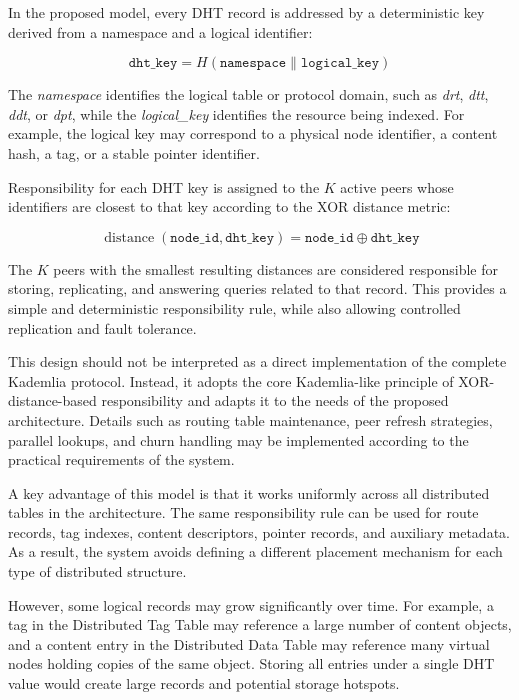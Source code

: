 \documentclass[12pt,a4paper]{article}
\begin{document}
In the proposed model, every DHT record is addressed by a deterministic key derived
from a namespace and a logical identifier:

\[
\texttt{dht\_key} = H(\texttt{namespace} \parallel \texttt{logical\_key})
\]

The \textit{namespace} identifies the logical table or protocol domain, such as
\textit{drt}, \textit{dtt}, \textit{ddt}, or \textit{dpt}, while the
\textit{logical\_key} identifies the resource being indexed. For example, the logical
key may correspond to a physical node identifier, a content hash, a tag, or a stable
pointer identifier.

Responsibility for each DHT key is assigned to the \(K\) active peers whose
identifiers are closest to that key according to the XOR distance metric:

\[
\operatorname{distance}(\texttt{node\_id}, \texttt{dht\_key}) = \texttt{node\_id} \oplus \texttt{dht\_key}
\]

The \(K\) peers with the smallest resulting distances are considered responsible for
storing, replicating, and answering queries related to that record. This provides a
simple and deterministic responsibility rule, while also allowing controlled
replication and fault tolerance.

This design should not be interpreted as a direct implementation of the complete
Kademlia protocol. Instead, it adopts the core Kademlia-like principle of
XOR-distance-based responsibility and adapts it to the needs of the proposed
architecture. Details such as routing table maintenance, peer refresh strategies,
parallel lookups, and churn handling may be implemented according to the practical
requirements of the system.

A key advantage of this model is that it works uniformly across all distributed
tables in the architecture. The same responsibility rule can be used for route
records, tag indexes, content descriptors, pointer records, and auxiliary metadata.
As a result, the system avoids defining a different placement mechanism for each
type of distributed structure.

However, some logical records may grow significantly over time. For example, a tag
in the Distributed Tag Table may reference a large number of content objects, and a
content entry in the Distributed Data Table may reference many virtual nodes holding
copies of the same object. Storing all entries under a single DHT value would create
large records and potential storage hotspots.
\end{document}

